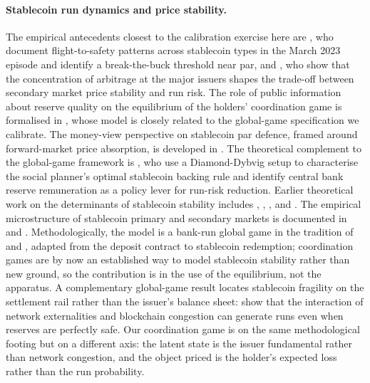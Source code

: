 \paragraph{Stablecoin run dynamics and price stability.} The empirical antecedents closest to the calibration exercise here are \citet{anadu_etal_2023_runs}, who document flight-to-safety patterns across stablecoin types in the March 2023 episode and identify a break-the-buck threshold near par, and \citet{ma_zeng_zhang_2025}, who show that the concentration of arbitrage at the major issuers shapes the trade-off between secondary market price stability and run risk. The role of public information about reserve quality on the equilibrium of the holders' coordination game is formalised in \citet{ahmed_aldasoro_duley_2025}, whose model is closely related to the global-game specification we calibrate. The money-view perspective on stablecoin par defence, framed around forward-market price absorption, is developed in \citet{aldasoro_mehrling_neilson_2023}. The theoretical complement to the global-game framework is \citet{li_mancini_griffoli_etal_2026}, who use a Diamond-Dybvig setup to characterise the social planner's optimal stablecoin backing rule and identify central bank reserve remuneration as a policy lever for run-risk reduction. Earlier theoretical work on the determinants of stablecoin stability includes \citet{routledge_zetlin_jones_2022}, \citet{liao_2021}, \citet{lyons_viswanath_natraj_2023}, and \citet{li_mayer_2024}. The empirical microstructure of stablecoin primary and secondary markets is documented in \citet{watsky_etal_2024} and \citet{du_sonawane_watsky_2025}. Methodologically, the model is a bank-run global game in the tradition of \citet{morris_shin_1998} and \citet{goldstein_pauzner_2005_demand_deposits}, adapted from the deposit contract to stablecoin redemption; coordination games are by now an established way to model stablecoin stability rather than new ground, so the contribution is in the use of the equilibrium, not the apparatus. A complementary global-game result locates stablecoin fragility on the settlement rail rather than the issuer's balance sheet: \citet{klee_etal_2026_fragility} show that the interaction of network externalities and blockchain congestion can generate runs even when reserves are perfectly safe. Our coordination game is on the same methodological footing but on a different axis: the latent state is the issuer fundamental rather than network congestion, and the object priced is the holder's expected loss rather than the run probability.

